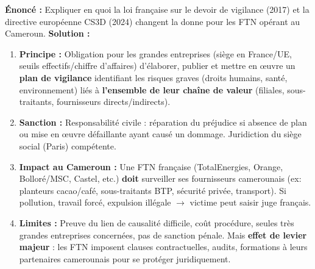 \documentclass[11pt]{article}
\begin{document}
\begin{exoresolu}
\textbf{Énoncé :} Expliquer en quoi la loi française sur le devoir de vigilance (2017) et la directive européenne CS3D (2024) changent la donne pour les FTN opérant au Cameroun.
\textbf{Solution :}
\begin{enumerate}
    \item \textbf{Principe :} Obligation pour les grandes entreprises (siège en France/UE, seuils effectifs/chiffre d'affaires) d'élaborer, publier et mettre en œuvre un \textbf{plan de vigilance} identifiant les risques graves (droits humains, santé, environnement) liés à \textbf{l'ensemble de leur chaîne de valeur} (filiales, sous-traitants, fournisseurs directs/indirects).
    \item \textbf{Sanction :} Responsabilité civile : réparation du préjudice si absence de plan ou mise en œuvre défaillante ayant causé un dommage. Juridiction du siège social (Paris) compétente.
    \item \textbf{Impact au Cameroun :} Une FTN française (TotalEnergies, Orange, Bolloré/MSC, Castel, etc.) \textbf{doit} surveiller ses fournisseurs camerounais (ex: planteurs cacao/café, sous-traitants BTP, sécurité privée, transport). Si pollution, travail forcé, expulsion illégale $\to$ victime peut saisir juge français.
    \item \textbf{Limites :} Preuve du lien de causalité difficile, coût procédure, seules très grandes entreprises concernées, pas de sanction pénale. Mais \textbf{effet de levier majeur} : les FTN imposent clauses contractuelles, audits, formations à leurs partenaires camerounais pour se protéger juridiquement.
\end{enumerate}
\end{exoresolu}
\end{document}
